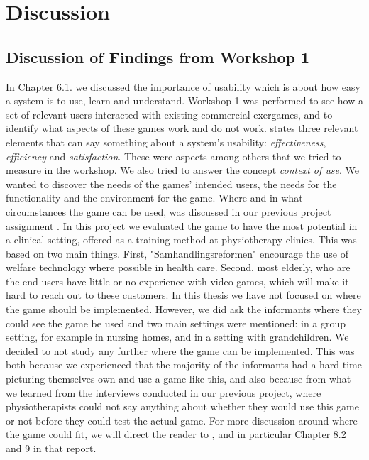 \chapter{Discussion}
\label{chap:discussion}

\section{Discussion of Findings from Workshop 1}

In Chapter 6.1. we discussed the importance of usability which is about how easy a system is to use, learn and understand. Workshop 1 was performed to see how a set of relevant users interacted with existing commercial exergames, and to identify what aspects of these games work and do not work. \cite{usabilitydef} states three relevant elements that can say something about a system's usability: \emph{effectiveness}, \emph{efficiency}  and \emph{satisfaction}. These were aspects among others that we tried to measure in the workshop. We also tried to answer the concept \emph{context of use}. We wanted to discover the needs of the games' intended users, the needs for the functionality and the environment for the game. Where and in what circumstances the game can be used, was discussed in our previous project assignment \cite{project}. In this project we evaluated the game to have the most potential in a clinical setting, offered as a training method at physiotherapy clinics. This was based on two main things. First, "Samhandlingsreformen" encourage the use of welfare technology where possible in health care. Second, most elderly, who are the end-users have little or no experience with video games, which will make it hard to reach out to these customers. In this thesis we have not focused on where the game should be implemented. However, we did ask the informants where they could see the game be used and two main settings were mentioned: in a group setting, for example in nursing homes, and in a setting with grandchildren. We decided to not study any further where the game can be implemented. This was both because we experienced that the majority of the informants had a hard time picturing themselves own and use a game like this, and also because from what we learned from the interviews conducted in our previous project, where physiotherapists could not say anything about whether they would use this game or not before they could test the actual game. For more discussion around where the game could fit, we will direct the reader to \cite{project}, and in particular Chapter 8.2 and 9 in that report. 

